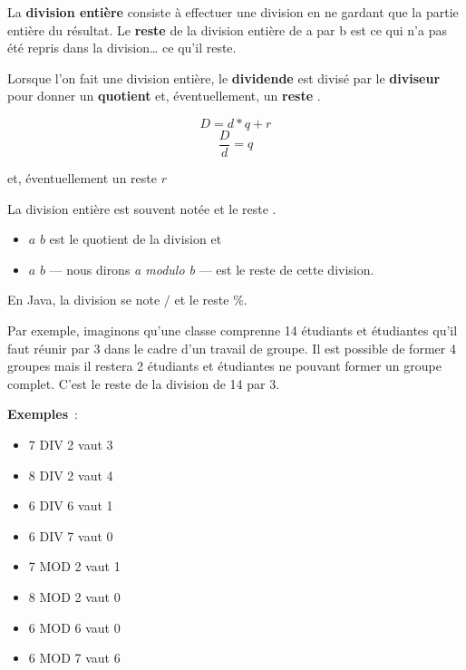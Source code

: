 			La \textbf{division entière} consiste à effectuer une division
			en ne gardant que la partie entière du résultat.
			Le \textbf{reste} de la division entière de a par b
			est ce qui n’a pas été repris dans la division… ce qu'il reste. 
			
			Lorsque l'on fait une division entière, le
			\textbf{dividende}  est divisé par le \textbf{diviseur} 
			pour donner un \textbf{quotient}  et, éventuellement, un
			\textbf{reste} .

			\[
				D = d * q + r 
			\]\[
				\frac{D}{d} = q 
			\]
			\begin{flushright}
				et, éventuellement un reste  $r$				
			\end{flushright}
				
			La division entière est souvent notée  et le
			reste . 
			
			\begin{itemize}
				\item $a$  $b$ est le quotient de la division et
				\item $a$  $b$ — nous dirons \textit{a modulo b} — 
					est le reste de cette division.  
			\end{itemize}

			En Java, la division se note $/$ et le reste $\%$.
			
			Par exemple, imaginons qu’une classe comprenne 14 étudiants et
			étudiantes qu’il faut réunir par 3 dans le cadre d’un travail de
			groupe.  Il est possible de former 4 groupes mais il restera
			2 étudiants et étudiantes ne pouvant former un groupe complet.
			C’est le reste de la division de 14 par 3.
			
			\textbf{Exemples}~:	
			
			\begin{minipage}{9cm}
			\begin{multicols}{2}
			\begin{itemize}
				\item 7 DIV 2 vaut 3
				\item 8 DIV 2 vaut 4
				\item 6 DIV 6 vaut 1
				\item 6 DIV 7 vaut 0
				\item 7 MOD 2 vaut 1
				\item 8 MOD 2 vaut 0
				\item 6 MOD 6 vaut 0
				\item 6 MOD 7 vaut 6
			\end{itemize}
			\end{multicols}
			\end{minipage}

